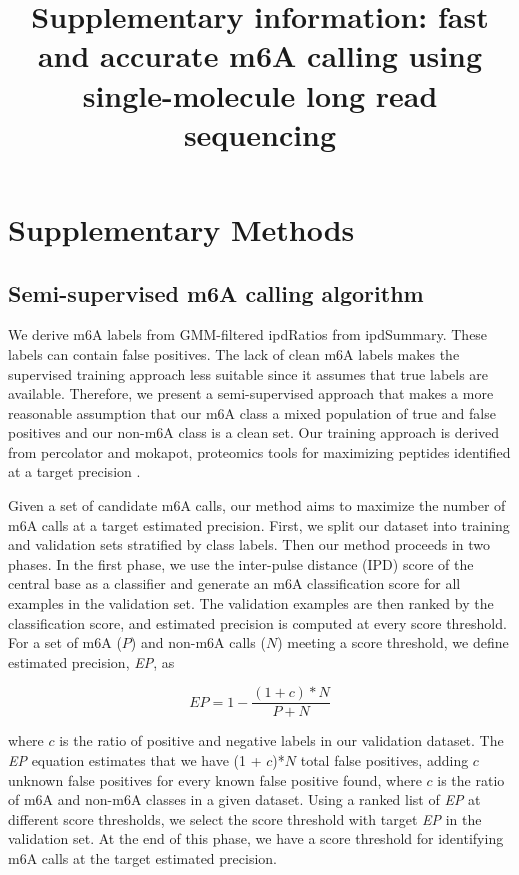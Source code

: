 \documentclass{article}
\date{}
\title{Supplementary information: fast and accurate m6A calling using single-molecule long read sequencing}
\begin{document}
\maketitle

\section{Supplementary Methods}
\subsection{Semi-supervised m6A calling algorithm}
We derive m6A labels from GMM-filtered ipdRatios from ipdSummary. These labels can contain false positives. The lack of clean m6A labels makes the supervised training approach less suitable since it assumes that true labels are available. Therefore, we present a semi-supervised approach that makes a more reasonable assumption that our m6A class a mixed population of true and false positives and our non-m6A class is a clean set. Our training approach is derived from percolator and mokapot, proteomics tools for maximizing peptides identified at a target precision \cite{fondrie2021mokapot,kall2007semi}.  

Given a set of candidate m6A calls, our method aims to maximize the number of m6A calls at a target estimated precision. First, we split our dataset into training and validation sets stratified by class labels. Then our method proceeds in two phases. In the first phase, we use the inter-pulse distance (IPD) score of the central base as a classifier and generate an m6A classification score for all examples in the validation set. The validation examples are then ranked by the classification score, and estimated precision is computed at every score threshold.  For a set of m6A ($P$) and non-m6A calls ($N$) meeting a score threshold, we define estimated precision, \textit{EP}, as 

\begin{equation}
EP = 1-\frac{(1 + c) * N}{P + N} 
\end{equation}

where $c$ is the ratio of positive and negative labels in our validation dataset. The \textit{EP} equation estimates that we have (1 + $c$)*$N$ total false positives, adding $c$ unknown false positives for every known false positive found, where $c$ is the ratio of m6A and non-m6A classes in a given dataset. Using a ranked list of \textit{EP} at different score thresholds, we select the score threshold with target \textit{EP} in the validation set.  At the end of this phase, we have a score threshold for identifying m6A calls at the target estimated precision. 
\end{document}
